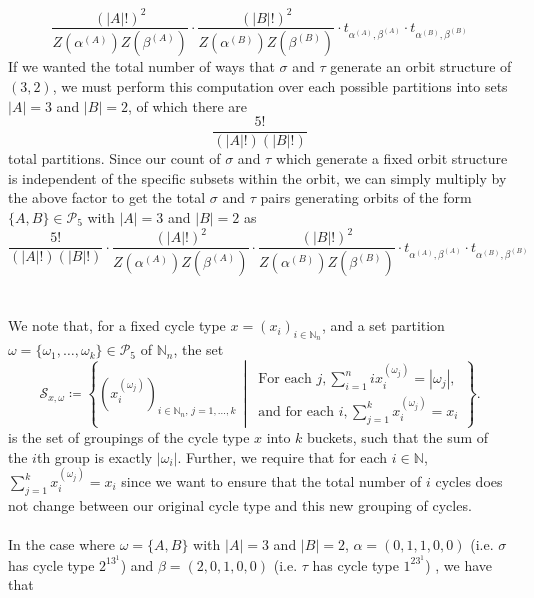 \[
	\frac{(|A|!)^2}{Z(\alpha^{(A)})Z(\beta^{(A)})}\cdot\frac{(|B|!)^2}{Z(\alpha^{(B)})Z(\beta^{(B)})}\cdot t_{\alpha^{(A)},\beta^{(A)}}\cdot t_{\alpha^{(B)},\beta^{(B)}}
\]
If we wanted the total number of ways that $\sigma$ and $\tau$ generate an orbit structure of $(3,2)$, we must perform this computation over each possible partitions into sets $|A|=3$ and $|B|=2$, of which there are 
\[
\frac{5!}{(|A|!)(|B|!)}
\]
total partitions. Since our count of $\sigma$ and $\tau$ which generate a fixed orbit structure is independent of the specific subsets within the orbit, we can simply multiply by the above factor to get the total $\sigma$ and $\tau$ pairs generating orbits of the form $\{A,B\}\in\mathcal{P}_5$ with $|A| = 3$ and $|B| = 2$ as
\[
	\frac{5!}{(|A|!)(|B|!)}\cdot\frac{(|A|!)^2}{Z(\alpha^{(A)})Z(\beta^{(A)})}\cdot\frac{(|B|!)^2}{Z(\alpha^{(B)})Z(\beta^{(B)})}\cdot t_{\alpha^{(A)},\beta^{(A)}}\cdot t_{\alpha^{(B)},\beta^{(B)}}
\]
\\\\We note that, for a fixed cycle type \( x = (x_i)_{i \in \mathbb{N}_n} \), and a set partition \( \omega = \{\omega_1, \dots, \omega_k\} \in \mathcal{P}_5 \) of $\mathbb{N}_n$, the set
\[
\mathcal{S}_{x,\omega} \coloneqq \left\{ \left(x^{(\omega_j)}_i\right)_{i \in \mathbb{N}_n,\, j = 1,\dots,k} \,\middle|\, 
\begin{array}{l}
\text{For each } j, \sum_{i=1}^n i x^{(\omega_j)}_i = |\omega_j|, \\
\text{and for each } i, \sum_{j=1}^k x^{(\omega_j)}_i = x_i
\end{array}
\right\}.
\] is the set of groupings of the cycle type $x$ into $k$ buckets, such that the sum of the $i$th group is exactly $|\omega_i|$. Further, we require that for each $i\in\mathbb{N}$, $\sum_{j=1}^k x^{(\omega_j)}_i = x_i$ since we want to ensure that the total number of $i$ cycles does not change between our original cycle type and this new grouping of cycles.
\\\\In the case where $\omega = \{A,B\}$ with $|A| = 3$ and $|B| = 2$, $\alpha = (0,1,1,0,0)$ (i.e. $\sigma$ has cycle type $2^13^1$) and $\beta=(2,0,1,0,0)$ (i.e. $\tau$ has cycle type $1^23^1$) , we have that 
